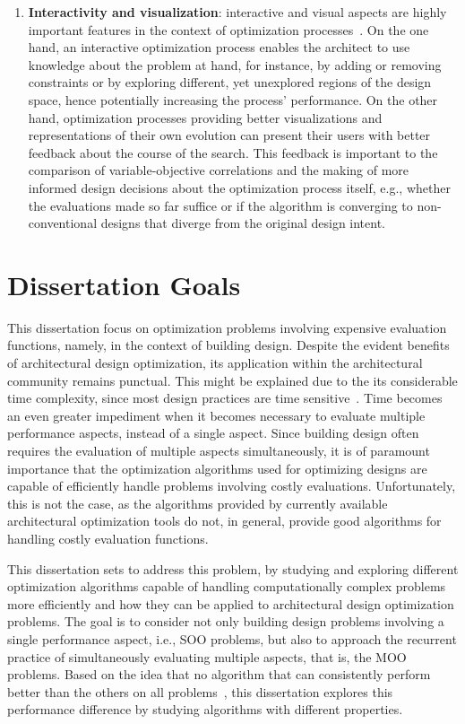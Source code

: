 \begin{enumerate}
\item \textbf{Interactivity and visualization}: interactive and visual aspects are highly important features in the context of optimization processes~\cite{Ashour2015CreativelyMOO}. On the one hand, an interactive optimization process enables the architect to use knowledge about the problem at hand, for instance, by adding or removing constraints or by exploring different, yet unexplored regions of the design space, hence potentially increasing the process' performance. On the other hand, optimization processes providing better visualizations and representations of their own evolution can present their users with better feedback about the course of the search. This feedback is important to the comparison of variable-objective correlations and the making of more informed design decisions about the optimization process itself, e.g., whether the evaluations made so far suffice or if the algorithm is converging to non-conventional designs that diverge from the original design intent.
\end{enumerate}


\section{Dissertation Goals}
\label{sec:goals}

This dissertation focus on optimization problems involving expensive evaluation functions, namely, in the context of building design. Despite the evident benefits of architectural design optimization, its application within the architectural community remains punctual. This might be explained due to the its considerable time complexity, since most design practices are time sensitive~\cite{Shi2016}. Time becomes an even greater impediment when it becomes necessary to evaluate multiple performance aspects, instead of a single aspect. Since building design often requires the evaluation of multiple aspects simultaneously, it is of paramount importance that the optimization algorithms used for optimizing designs are capable of efficiently handle problems involving costly evaluations. Unfortunately, this is not the case, as the algorithms provided by currently available architectural optimization tools do not, in general, provide good algorithms for handling costly evaluation functions.

This dissertation sets to address this problem, by studying and exploring different optimization algorithms capable of handling computationally complex problems more efficiently and how they can be applied to architectural design optimization problems. The goal is to consider not only building design problems involving a single performance aspect, i.e., \ac{SOO} problems, but also to approach the recurrent practice of simultaneously evaluating multiple aspects, that is, the \ac{MOO} problems. Based on the idea that no algorithm that can consistently perform better than the others on all problems~\cite{Wolpert1997NFLT}, this dissertation explores this performance difference by studying algorithms with different properties. 

